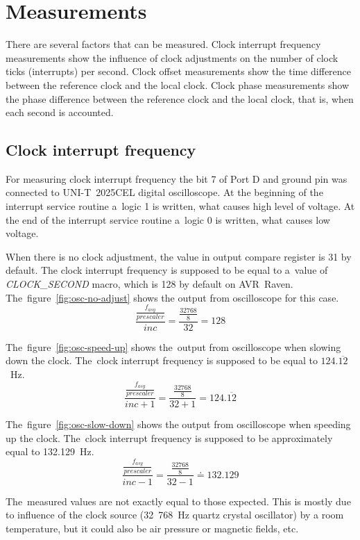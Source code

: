 
\chapter{Measurements}\label{chap:measurements}
There are several factors that can be measured.
Clock interrupt frequency measurements show the influence of clock adjustments
on the number of clock ticks (interrupts) per second.
Clock offset measurements show the time difference between the reference clock and
the local clock.
Clock phase measurements show the phase difference between the reference clock and
the local clock, that is, when each second is accounted.

\section{Clock interrupt frequency}
For measuring clock interrupt frequency the bit 7 of Port D
and ground pin was connected to UNI-T~2025CEL digital oscilloscope.
At the beginning of the interrupt service routine a~logic 1 is written,
what causes high level of voltage.
At the end of the interrupt service routine a~logic 0 is written,
what causes low voltage.

When there is no clock adjustment, the value in output compare register is 31 by default.
The clock interrupt frequency
is supposed to be equal to a~value of {\it{CLOCK\_SECOND}} macro, which is 128 by default on AVR~Raven.
The~figure~\ref{fig:osc-no-adjust} shows the output from oscilloscope
for this case.
$$\frac{\frac{f_{asy}}{prescaler}}{inc} = \frac{\frac{32768}{8}}{32} = 128$$

The~figure~\ref{fig:osc-speed-up} shows the~output from oscilloscope
when slowing down the clock.
The~clock interrupt frequency
is supposed to be equal to $124.\overline{12}$~Hz.
$$\frac{\frac{f_{asy}}{prescaler}}{inc + 1} = \frac{\frac{32768}{8}}{32+1} = 124.\overline{12}$$

The~figure~\ref{fig:osc-slow-down} shows the output from oscilloscope
when speeding up the clock.
The~clock interrupt frequency
is supposed to be approximately equal to 132.129~Hz.
$$\frac{\frac{f_{asy}}{prescaler}}{inc - 1} = \frac{\frac{32768}{8}}{32-1} \doteq 132.129$$


The~measured values are not exactly equal to those expected.
This is mostly due to influence of the clock source
(32~768~Hz quartz crystal oscillator) by a room temperature,
but it could also be air pressure or magnetic fields, etc.


